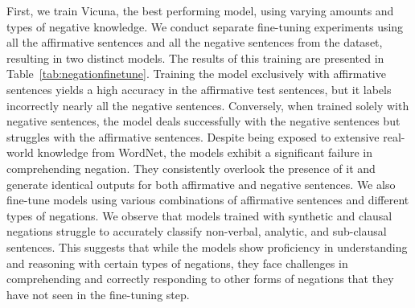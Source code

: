 \documentclass[11pt]{article}
\newcommand{\WORDNET}{WordNet}
\begin{document}
First, we train Vicuna, the best performing model, using varying amounts and types of negative knowledge. We conduct separate fine-tuning experiments using all the affirmative sentences and all the negative sentences from the dataset, resulting in two distinct models. The results of this training are presented in Table~\ref{tab:negationfinetune}. Training the model exclusively with affirmative sentences yields a high accuracy in the affirmative test sentences, but it labels incorrectly nearly all the negative sentences. Conversely, when trained solely with negative sentences, the model deals successfully with the negative sentences but struggles with the affirmative sentences. Despite being exposed to extensive real-world knowledge from \WORDNET{}, the models exhibit a significant failure in comprehending negation. They consistently overlook the presence of it and generate identical outputs for both affirmative and negative sentences. 
We also fine-tune models using various combinations of affirmative sentences and different types of negations. We observe that models trained with synthetic and clausal negations struggle to accurately classify non-verbal, analytic, and sub-clausal sentences. This suggests that while the models show proficiency in understanding and reasoning with certain types of negations, they face challenges in comprehending and correctly responding to other forms of negations that they have not seen in the fine-tuning step.
\end{document}
